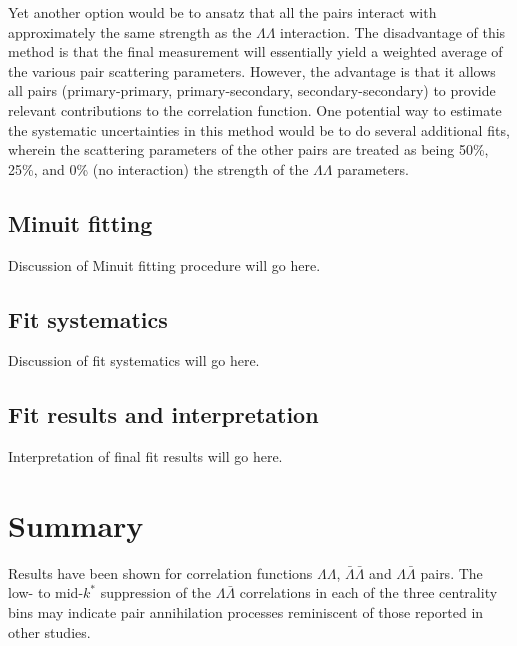 Yet another option would be to ansatz that all the pairs interact with approximately the same strength as the $\Lambda\Lambda$ interaction.  The disadvantage of this method is that the final measurement will essentially yield a weighted average of the various pair scattering parameters.  However, the advantage is that it allows all pairs (primary-primary, primary-secondary, secondary-secondary) to provide relevant contributions to the correlation function.  One potential way to estimate the systematic uncertainties in this method would be to do several additional fits, wherein the scattering parameters of the other pairs are treated as being 50\%, 25\%, and 0\% (no interaction) the strength of the $\Lambda\Lambda$ parameters.

\subsection{Minuit fitting}
\label{sec:MinuitFit}

Discussion of Minuit fitting procedure will go here.

\subsection{Fit systematics}
\label{sec:FitSystematics}

Discussion of fit systematics will go here.

\subsection{Fit results and interpretation}
\label{sec:FitResults}

Interpretation of final fit results will go here.

\section{Summary}
Results have been shown for correlation functions $\Lambda\Lambda$, $\bar{\Lambda}\bar{\Lambda}$ and $\Lambda\bar{\Lambda}$ pairs.  The low- to mid-$k^*$ suppression of the $\Lambda\bar{\Lambda}$ correlations in each of the three centrality bins may indicate pair annihilation processes reminiscent of those reported in other studies.











%
